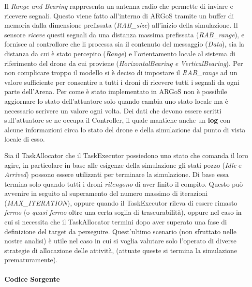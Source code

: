 \documentclass[a4paper,11pt,oneside, table]{article}
\begin{document}
Il \textit{Range and Bearing} rappresenta un antenna radio che permette di inviare e ricevere segnali. Questo viene fatto all'interno di ARGoS tramite un buffer di memoria dalla dimensione prefissata (\textit{RAB\_size}) all'inizio della simulazione.
Il sensore \textit{riceve} questi segnali da una distanza massima prefissata (\textit{RAB\_range}), e fornisce al controllore che li processa sia il contenuto del messaggio (\textit{Data}), sia la distanza da cui \`e stato percepito (\textit{Range}) e l'orientamento locale al sistema di riferimento del drone da cui proviene (\textit{HorizontalBearing e VerticalBearing}).
Per non complicare troppo il modello si \`e deciso di impostare il \textit{RAB\_range} ad un valore sufficiente per consentire a tutti i droni di ricevere tutti i segnali da ogni parte dell'Arena.
Per come \`e stato implementato in ARGoS non \`e possibile aggiornare lo stato dell'attuatore solo quando cambia uno stato locale ma \`e necessario scrivere un valore ogni volta. %
Dei dati che devono essere scritti sull'attuatore se ne occupa il Controller, il quale mantiene anche un \textbf{log} con alcune informazioni circa lo stato del drone e della simulazione dal punto di vista locale di esso.

Sia il TaskAllocator che il TaskExecutor possiedono uno stato che comanda il loro agire, in particolare in base alle esigenze della simulazione gli stati pozzo (\textit{Idle} e \textit{Arrived}) possono essere utilizzati per terminare la simulazione.
Di base essa termina solo quando tutti i droni \textit{ritengono} di aver finito il compito. Questo pu\`o avvenire in seguito al superamento del numero massimo di iterazioni (\textit{MAX\_ITERATION}), oppure quando il TaskExecutor rileva di essere rimasto \textit{fermo} (o \textit{quasi fermo} oltre una certa soglia di trascurabilit\`a), oppure nel caso in cui si necessita che il TaskAllocator termini dopo aver superato una fase di definizione del target da perseguire.
Quest'ultimo scenario (non sfruttato nelle nostre analisi) \`e utile nel caso in cui si voglia valutare solo l'operato di diverse strategie di allocazione delle attivit\`a, (attuate queste si termina la simulazione prematuramente).

\paragraph{Codice Sorgente}
\end{document}
